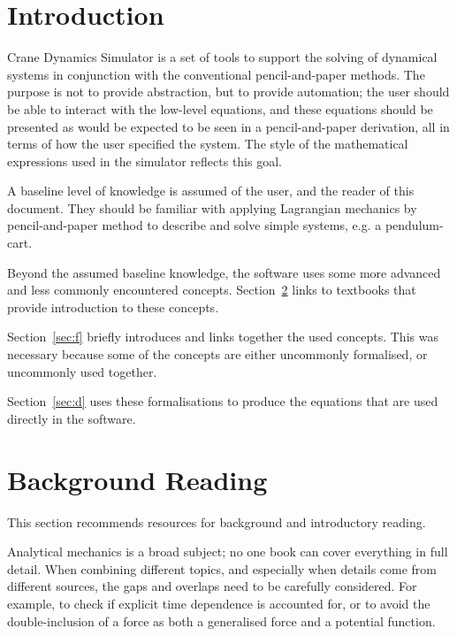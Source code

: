 \documentclass[11pt]{article}
\renewcommand{\secref}[1]{Section~\ref{#1}}
\begin{document}
\section{Introduction} \label{sec:intro}
Crane Dynamics Simulator is a set of tools to support the solving of dynamical systems in conjunction with the conventional pencil-and-paper methods. The purpose is not to provide abstraction, but to provide automation; the user should be able to interact with the low-level equations, and these equations should be presented as would be expected to be seen in a pencil-and-paper derivation, all in terms of how the user specified the system. The style of the mathematical expressions used in the simulator reflects this goal.

A baseline level of knowledge is assumed of the user, and the reader of this document. They should be familiar with applying Lagrangian mechanics by pencil-and-paper method to describe and solve simple systems, e.g. a pendulum-cart.

Beyond the assumed baseline knowledge, the software uses some more advanced and less commonly encountered concepts. \secref{sec:textbooks} links to textbooks that provide introduction to these concepts.

\secref{sec:f} briefly introduces and links together the used concepts. This was necessary because some of the concepts are either uncommonly formalised, or uncommonly used together.

\secref{sec:d} uses these formalisations to produce the equations that are used directly in the software.


\section{Background Reading} \label{sec:textbooks}
This section recommends resources for background and introductory reading.

Analytical mechanics is a broad subject; no one book can cover everything in full detail. When combining different topics, and especially when details come from different sources, the gaps and overlaps need to be carefully considered. For example, to check if explicit time dependence is accounted for, or to avoid the double-inclusion of a force as both a generalised force and a potential function.
\end{document}
